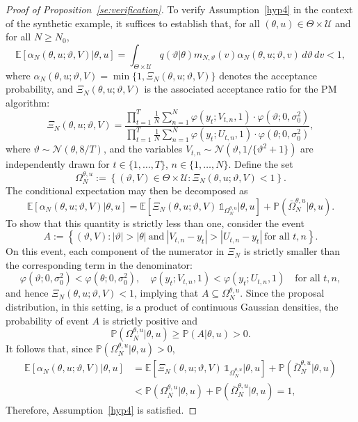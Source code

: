 \documentclass[pdflatex,sn-mathphys-num]{sn-jnl}
\newcommand{\Prob}{\mathbb{P}}
\newcommand{\E}{\mathbb{E}}
\newcommand{\ind}{\mathds{1}}
\renewcommand{\geq}{\geqslant}
\theoremstyle{thmstyleone}
\theoremstyle{thmstyletwo}
\theoremstyle{thmstylethree}
\begin{document}
\begin{proof}[Proof of Proposition~\ref{se:verification}]
To verify Assumption~\ref{hyp4} in the context of the synthetic example, it suffices to establish that, for all \( (\theta, u) \in \Theta \times \mathcal{U} \) and for all \( N \geq N_0 \),
\begin{equation*}
    \E[\alpha_N(\theta, u; \vartheta, V) |\theta, u] 
    = \int_{\Theta \times \mathcal{U}} q(\vartheta |\theta) m_{N,\vartheta}(v) 
    \alpha_N(\theta, u; \vartheta, v) \, d\vartheta \, dv < 1,
    \label{eq:assump4_expectation}
\end{equation*}
where \( \alpha_N(\theta, u; \vartheta, V) = \min\{1, \Xi_N(\theta, u; \vartheta, V)\} \) denotes the acceptance probability, and \( \Xi_N(\theta, u; \vartheta, V) \) is the associated acceptance ratio for the PM algorithm:
\[
\Xi_N(\theta, u; \vartheta, V) 
= \frac{ \prod_{t=1}^T \frac{1}{N} \sum_{n=1}^N \varphi(y_t; V_{t,n}, 1) \cdot \varphi(\vartheta; 0, \sigma_0^2)}{ \prod_{t=1}^T \frac{1}{N} \sum_{n=1}^N \varphi(y_t; U_{t,n}, 1) \cdot \varphi(\theta; 0, \sigma_0^2) },
\]
where \( \vartheta \sim \mathcal{N}(\theta, 8/T) \), and the variables \( V_{t,n} \sim \mathcal{N}(\vartheta, 1/\{\vartheta^2 + 1\}) \) are independently drawn for \( t \in \{1, \ldots, T\} \), \( n \in \{1, \ldots, N\} \).
Define the set
\[
\Omega_N^{\theta, u} := \left\{ (\vartheta, V) \in \Theta \times \mathcal{U} : \Xi_N(\theta, u; \vartheta, V) < 1 \right\}.
\]
The conditional expectation may then be decomposed as
\[
\E[\alpha_N(\theta, u; \vartheta, V) |\theta, u] 
= \E[\Xi_N(\theta, u; \vartheta, V) \, \ind_{\Omega_N^{\theta, u}} |\theta, u] 
+ \Prob(\bar{\Omega}_N^{\theta, u} |\theta, u).
\]
To show that this quantity is strictly less than one, consider the event
\[
A := \left\{ (\vartheta, V) : |\vartheta| > |\theta| 
\ \text{and} \ |V_{t,n} - y_t| > |U_{t,n} - y_t| \ \text{for all } t, n \right\}.
\]
On this event, each component of the numerator in \( \Xi_N \) is strictly smaller than the corresponding term in the denominator:
\[
\varphi(\vartheta; 0, \sigma_0^2) < \varphi(\theta; 0, \sigma_0^2), \quad 
\varphi(y_t; V_{t,n}, 1) < \varphi(y_t; U_{t,n}, 1) \quad \text{for all } t, n,
\]
and hence \( \Xi_N(\theta, u; \vartheta, V) < 1 \), implying that \( A \subseteq \Omega_N^{\theta, u} \). Since the proposal distribution, in this setting, is a product of continuous Gaussian densities, the probability of event \( A \) is strictly positive and
\[
\Prob(\Omega_N^{\theta, u} |\theta, u) \geq \Prob(A |\theta, u) > 0.
\]
It follows that, since \( \Prob(\Omega_N^{\theta, u} |\theta, u) > 0 \),
\begin{align*}
\E[\alpha_N(\theta, u; \vartheta, V) |\theta, u]
&= \E[\Xi_N(\theta, u; \vartheta, V) \, \ind_{\Omega_N^{\theta, u}} |\theta, u] 
+ \Prob(\bar{\Omega}_N^{\theta, u} |\theta, u) \\
&< \Prob(\Omega_N^{\theta, u} |\theta, u) + \Prob(\bar{\Omega}_N^{\theta, u} |\theta, u) = 1,
\end{align*}
Therefore, Assumption~\ref{hyp4} is satisfied.


\end{proof}
\end{document}
